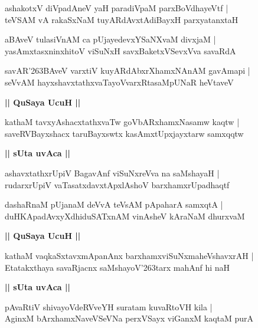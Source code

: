 \documentclass[twoside,12pt,openright]{book}
\def\S{\char'263}
\newcounter{shloka}[chapter]
\def\uvaca#1{\centerline{{\large\textbf{#1}}}}
\begin{document}
\begin{shloka}%
ashakotxV diVpadAneV yaH paradiVpaM parxBoVdhayeVtf |\\
teVSAM vA rakaSxNaM tuyARdAvxtAdiBayxH parxyatanxtaH 
\end{shloka}

\begin{shloka}%
aBAveV tulasiVnAM ca pUjayedevxYSaNXvaM divxjaM |\\
yasAmxtasxninxhitoV viSuNxH savxBaketxVSevxVva savaRdA 
\end{shloka}

\begin{shloka}%
savAR\S BAveV varxtiV kuyARdAbxrXhamxNAnAM gavAmapi |\\
seVvAM hayxshavxtathxvaTayoVvarxRtasaMpUNaR heVtaveV 
\end{shloka}

\uvaca{|| QuSaya UcuH ||}

\begin{shloka}%
kathaM tavxyAshacxtathxvaTw goVbARxhamxNasamw kaqtw |\\
saveRVBayxshacx taruBayxswtx kasAmxtUpxjayxtarw samxqqtw 
\end{shloka}

\uvaca{|| sUta uvAca ||}

\begin{shloka}%
ashavxtathxrUpiV BagavAnf viSuNxreVva na saMshayaH |\\
rudarxrUpiV vaTasatxdavxtApxlAshoV barxhamxrUpadhaqtf 
\end{shloka}

\begin{shloka}%
dashaRnaM pUjanaM deVvA teVsAM pApaharA samxqtA |\\
duHKApadAvxyXdhiduSATxnAM vinAsheV kAraNaM dhurxvaM 
\end{shloka}

\uvaca{|| QuSaya UcuH ||}

\begin{shloka}%
kathaM vaqkaSxtavxmApanAnx barxhamxviSuNxmaheVshavxrAH |\\
Etatakxthaya savaRjacnx saMshayoV\S tarx mahAnf hi naH 
\end{shloka}

\uvaca{|| sUta uvAca ||}

\begin{shloka}%
pAvaRtiV shivayoVdeRVveYH suratam kuvaRtoVH kila |\\
AginxM bArxhamxNaveVSeVNa perxVSayx viGanxM kaqtaM purA 
\end{shloka}
\end{document}
